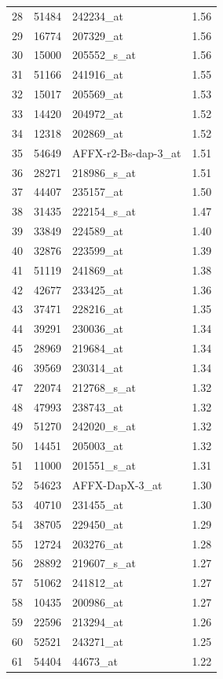 \documentclass[a4paper, 12pt]{report}
\begin{document}
\begin{footnotesize}
\begin{longtable}{|>{}m{1cm} |>{}m{2cm} | >{}m{5cm}| >{}m{4cm} | }
  28 & 51484 & 242234\_at & 1.56 \\ 
  29 & 16774 & 207329\_at & 1.56 \\ 
  30 & 15000 & 205552\_s\_at & 1.56 \\ 
  31 & 51166 & 241916\_at & 1.55 \\ 
  32 & 15017 & 205569\_at & 1.53 \\ 
  33 & 14420 & 204972\_at & 1.52 \\ 
  34 & 12318 & 202869\_at & 1.52 \\ 
  35 & 54649 & AFFX-r2-Bs-dap-3\_at & 1.51 \\ 
  36 & 28271 & 218986\_s\_at & 1.51 \\ 
  37 & 44407 & 235157\_at & 1.50 \\ 
  38 & 31435 & 222154\_s\_at & 1.47 \\ 
  39 & 33849 & 224589\_at & 1.40 \\ 
  40 & 32876 & 223599\_at & 1.39 \\ 
  41 & 51119 & 241869\_at & 1.38 \\ 
  42 & 42677 & 233425\_at & 1.36 \\ 
  43 & 37471 & 228216\_at & 1.35 \\ 
  44 & 39291 & 230036\_at & 1.34 \\ 
  45 & 28969 & 219684\_at & 1.34 \\ 
  46 & 39569 & 230314\_at & 1.34 \\ 
  47 & 22074 & 212768\_s\_at & 1.32 \\ 
  48 & 47993 & 238743\_at & 1.32 \\ 
  49 & 51270 & 242020\_s\_at & 1.32 \\ 
  50 & 14451 & 205003\_at & 1.32 \\ 
  51 & 11000 & 201551\_s\_at & 1.31 \\ 
  52 & 54623 & AFFX-DapX-3\_at & 1.30 \\ 
  53 & 40710 & 231455\_at & 1.30 \\ 
  54 & 38705 & 229450\_at & 1.29 \\ 
  55 & 12724 & 203276\_at & 1.28 \\ 
  56 & 28892 & 219607\_s\_at & 1.27 \\ 
  57 & 51062 & 241812\_at & 1.27 \\ 
  58 & 10435 & 200986\_at & 1.27 \\ 
  59 & 22596 & 213294\_at & 1.26 \\ 
  60 & 52521 & 243271\_at & 1.25 \\ 
  61 & 54404 & 44673\_at & 1.22 \\ 

\end{longtable}
\end{footnotesize}
\end{document}
